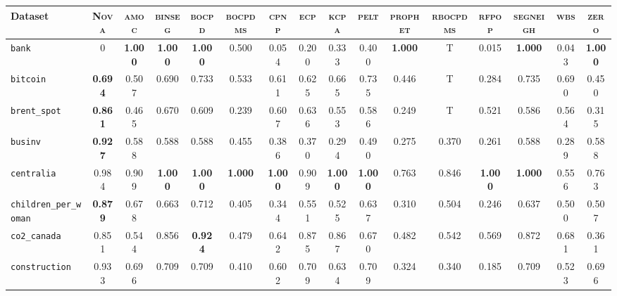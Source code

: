 \begin{table*}[h!]
\begin{adjustbox}{width=\textwidth}
    \begin{tabular}{l|c|cccccccccccccc}
    Dataset & \textsc{Nova} & \textsc{amoc} & \textsc{binseg} & \textsc{bocpd} & \textsc{bocpdms} & \textsc{cpnp} & \textsc{ecp} & \textsc{kcpa} & \textsc{pelt} & \textsc{prophet} & \textsc{rbocpdms} & \textsc{rfpop} & \textsc{segneigh} & \textsc{wbs} & \textsc{zero}\\
    \hline
    \cellcolor{gray!100}\verb+bank+ & \cellcolor{gray!100}0 & \cellcolor{gray!100}\textbf{1.000} & \cellcolor{gray!100}\textbf{1.000} & \cellcolor{gray!100}\textbf{1.000} & \cellcolor{gray!100}0.500 & \cellcolor{gray!100}0.054 & \cellcolor{gray!100}0.200 & \cellcolor{gray!100}0.333 & \cellcolor{gray!100}0.400 & \cellcolor{gray!100}\textbf{1.000} & \cellcolor{gray!100}T & \cellcolor{gray!100}0.015 & \cellcolor{gray!100}\textbf{1.000} & \cellcolor{gray!100}0.043 & \cellcolor{gray!100}\textbf{1.000}\\
    \verb+bitcoin+ & \cellcolor{orange!04}\textbf{0.694} & 0.507 & 0.690 & 0.733 & 0.533 & 0.611 & 0.625 & 0.665 & 0.735 & 0.446 & T & 0.284 & 0.735 & 0.690 & 0.450\\
    \verb+brent_spot+ & \cellcolor{cyan!20}\textbf{0.861} & 0.465 & 0.670 & 0.609 & 0.239 & 0.607 & 0.636 & 0.553 & 0.586 & 0.249 & T & 0.521 & 0.586 & 0.564 & 0.315\\
    \verb+businv+ & \cellcolor{cyan!40}\textbf{0.927} & 0.588 & 0.588 & 0.588 & 0.455 & 0.386 & 0.370 & 0.294 & 0.490 & 0.275 & 0.370 & 0.261 & 0.588 & 0.289 & 0.588\\
    \verb+centralia+ & \cellcolor{orange!01}0.984 & 0.909 & \textbf{1.000} & \textbf{1.000} & \textbf{1.000} & \textbf{1.000} & 0.909 & \textbf{1.000} & \textbf{1.000} & 0.763 & 0.846 & \textbf{1.000} & \textbf{1.000} & 0.556 & 0.763\\
    \verb+children_per_woman+ & \cellcolor{cyan!16}\textbf{0.879} & 0.678 & 0.663 & 0.712 & 0.405 & 0.344 & 0.551 & 0.525 & 0.637 & 0.310 & 0.504 & 0.246 & 0.637 & 0.500 & 0.507\\
    
    \verb+co2_canada+ & \cellcolor{orange!07}0.851 & 0.544 & 0.856 & \textbf{0.924} & 0.479 & 0.642 & 0.875 & 0.867 & 0.670 & 0.482 & 0.542 & 0.569 & 0.872 & 0.681 & 0.361\\
    
    \verb+construction+ & \cellcolor{cyan!23}0.933 & 0.696 & 0.709 & 0.709 & 0.410 & 0.602 & 0.709 & 0.634 & 0.709 & 0.324 & 0.340 & 0.185 & 0.709 & 0.523 & 0.696\\
    

\end{tabular}
\end{adjustbox}
\end{table*}
